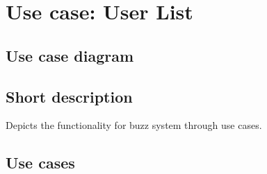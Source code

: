 

\section{Use case: User List}
	\subsection{Use case diagram}
	\subsection{Short description}
	\begin{description}
		\item[Depicts the functionality for buzz system through use cases.] 
	\end{description}
	\subsection{Use cases}

